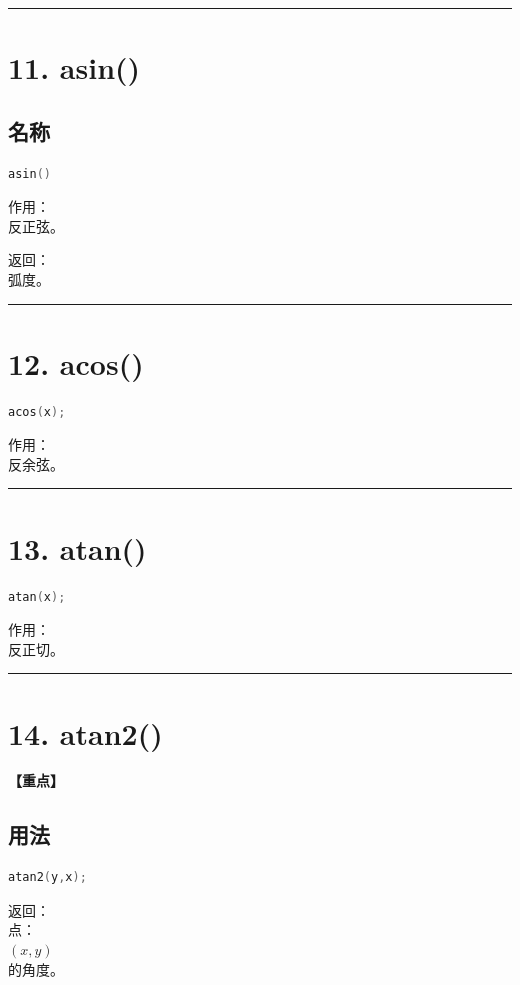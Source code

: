 \documentclass[10pt,twocolumn]{extarticle}
\begin{document}
\noindent\rule{\linewidth}{0.4pt}

\section{11. asin()}

\subsection{名称}
\begin{lstlisting}[language=C++]
asin()
\end{lstlisting}
作用：\\
反正弦。

返回：\\
弧度。

\noindent\rule{\linewidth}{0.4pt}

\section{12. acos()}
\begin{lstlisting}[language=C++]
acos(x);
\end{lstlisting}
作用：\\
反余弦。

\noindent\rule{\linewidth}{0.4pt}

\section{13. atan()}
\begin{lstlisting}[language=C++]
atan(x);
\end{lstlisting}
作用：\\
反正切。

\noindent\rule{\linewidth}{0.4pt}

\section{14. atan2()}

\textbf{【重点】}

\subsection{用法}
\begin{lstlisting}[language=C++]
atan2(y,x);
\end{lstlisting}
返回：\\
点：\\
$(x,y)$\\
的角度。
\end{document}
